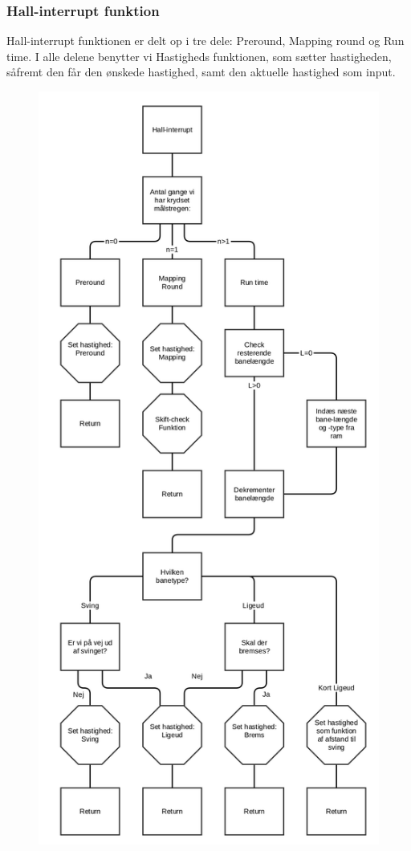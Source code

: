 \subsubsection{Hall-interrupt funktion}
\label{Hall-funktion}

Hall-interrupt funktionen er delt op i tre dele: Preround, Mapping round og Run time. I alle delene benytter vi Hastigheds funktionen, som sætter hastigheden, såfremt den får den ønskede hastighed, samt den aktuelle hastighed som input.

\begin{figure}[hbtp]
\begin{center}
\includegraphics[scale=0.1]{Billeder/hall_interrupt.png}

\end{center}
\end{figure}
